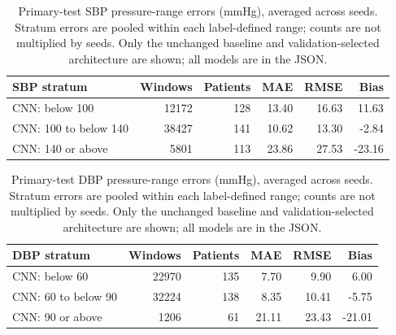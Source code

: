 \documentclass[11pt]{article}
\begin{document}
\begin{table}[!htbp]\centering\small
\begin{tabular}{lrrrrr}\toprule
SBP stratum & Windows & Patients & MAE & RMSE & Bias\\\midrule
CNN: below 100 & 12172 & 128 & 13.40 & 16.63 & 11.63\\
CNN: 100 to below 140 & 38427 & 141 & 10.62 & 13.30 & -2.84\\
CNN: 140 or above & 5801 & 113 & 23.86 & 27.53 & -23.16\\
\bottomrule\end{tabular}
\caption{Primary-test SBP pressure-range errors (mmHg), averaged across seeds. Stratum errors are pooled within each label-defined range; counts are not multiplied by seeds. Only the unchanged baseline and validation-selected architecture are shown; all models are in the JSON.}\end{table}

\begin{table}[!htbp]\centering\small
\begin{tabular}{lrrrrr}\toprule
DBP stratum & Windows & Patients & MAE & RMSE & Bias\\\midrule
CNN: below 60 & 22970 & 135 & 7.70 & 9.90 & 6.00\\
CNN: 60 to below 90 & 32224 & 138 & 8.35 & 10.41 & -5.75\\
CNN: 90 or above & 1206 & 61 & 21.11 & 23.43 & -21.01\\
\bottomrule\end{tabular}
\caption{Primary-test DBP pressure-range errors (mmHg), averaged across seeds. Stratum errors are pooled within each label-defined range; counts are not multiplied by seeds. Only the unchanged baseline and validation-selected architecture are shown; all models are in the JSON.}\end{table}
\end{document}
